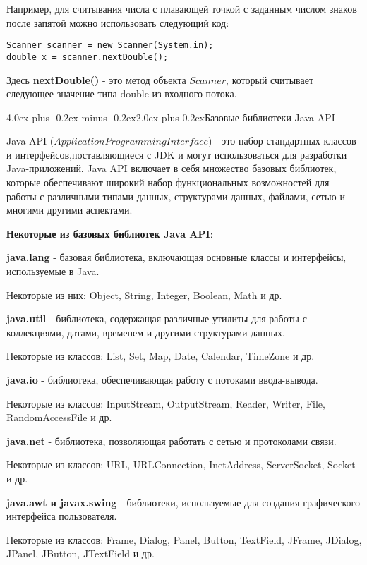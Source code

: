 \documentclass[12pt, a4paper]{book}%
\makeatletter
\renewcommand{\section}{\@startsection{section}{1}{1pt}%
{4.0ex plus -0.2ex minus -0.2ex}{2.0ex plus 0.2ex}{\centering\bf}}%
\makeatother
\begin{document}
{Например, для считывания числа с плавающей точкой с заданным числом знаков после запятой можно использовать следующий код:

\begin{lstlisting}
Scanner scanner = new Scanner(System.in);
double x = scanner.nextDouble();
\end{lstlisting}

Здесь {\bf nextDouble()} - это метод объекта $Scanner$, который считывает следующее значение типа double из входного потока.

\section{Базовые библиотеки Java API}

Java API ($Application Programming Interface$) - это набор стандартных классов и интерфейсов,поставляющиеся с JDK и могут использоваться для разработки Java-приложений. Java API включает в себя множество базовых библиотек, которые обеспечивают широкий набор функциональных возможностей для работы с различными типами данных, структурами данных, файлами, сетью и многими другими аспектами.

{\bf Некоторые из базовых библиотек Java API}:

{\bf java.lang} - базовая библиотека, включающая основные классы и интерфейсы, используемые в Java. 

Некоторые из них: Object, String, Integer, Boolean, Math и др.

{\bf java.util} - библиотека, содержащая различные утилиты для работы с коллекциями, датами, временем и другими структурами данных. 

Некоторые из классов: List, Set, Map, Date, Calendar, TimeZone и др.

{\bf java.io} - библиотека, обеспечивающая работу с потоками ввода-вывода. 

Некоторые из классов: InputStream, OutputStream, Reader, Writer, File, RandomAccessFile и др.

{\bf java.net} - библиотека, позволяющая работать с сетью и протоколами связи. 

Некоторые из классов: URL, URLConnection, InetAddress, ServerSocket, Socket и др.

{\bf java.awt и javax.swing} - библиотеки, используемые для создания графического интерфейса пользователя. 

Некоторые из классов: Frame, Dialog, Panel, Button, TextField, JFrame, JDialog, JPanel, JButton, JTextField и др.

}
\end{document}
